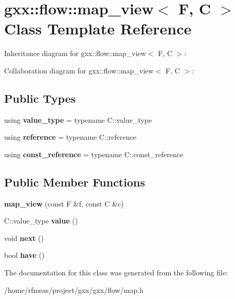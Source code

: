 \hypertarget{classgxx_1_1flow_1_1map__view}{}\section{gxx\+:\+:flow\+:\+:map\+\_\+view$<$ F, C $>$ Class Template Reference}
\label{classgxx_1_1flow_1_1map__view}


Inheritance diagram for gxx\+:\+:flow\+:\+:map\+\_\+view$<$ F, C $>$\+:


Collaboration diagram for gxx\+:\+:flow\+:\+:map\+\_\+view$<$ F, C $>$\+:
\subsection*{Public Types}
\begin{DoxyCompactItemize}
\item 
using {\bfseries value\+\_\+type} = typename C\+::value\+\_\+type\hypertarget{classgxx_1_1flow_1_1map__view_a7eead90d387b96cd8b576ea65512aab6}{}\label{classgxx_1_1flow_1_1map__view_a7eead90d387b96cd8b576ea65512aab6}

\item 
using {\bfseries reference} = typename C\+::reference\hypertarget{classgxx_1_1flow_1_1map__view_a44a6af74c93fb01ddb20a142ad14d72d}{}\label{classgxx_1_1flow_1_1map__view_a44a6af74c93fb01ddb20a142ad14d72d}

\item 
using {\bfseries const\+\_\+reference} = typename C\+::const\+\_\+reference\hypertarget{classgxx_1_1flow_1_1map__view_a8fbc38be10015b63adddd0bdf2beb396}{}\label{classgxx_1_1flow_1_1map__view_a8fbc38be10015b63adddd0bdf2beb396}

\end{DoxyCompactItemize}
\subsection*{Public Member Functions}
\begin{DoxyCompactItemize}
\item 
{\bfseries map\+\_\+view} (const F \&f, const C \&c)\hypertarget{classgxx_1_1flow_1_1map__view_a46c8417113f46ea2e7e4ef9a8f20a938}{}\label{classgxx_1_1flow_1_1map__view_a46c8417113f46ea2e7e4ef9a8f20a938}

\item 
C\+::value\+\_\+type {\bfseries value} ()\hypertarget{classgxx_1_1flow_1_1map__view_a2ed45e05e7c4228c468af488b5c00bb6}{}\label{classgxx_1_1flow_1_1map__view_a2ed45e05e7c4228c468af488b5c00bb6}

\item 
void {\bfseries next} ()\hypertarget{classgxx_1_1flow_1_1map__view_aa63b2e7fc104213feac858c5d8676986}{}\label{classgxx_1_1flow_1_1map__view_aa63b2e7fc104213feac858c5d8676986}

\item 
bool {\bfseries have} ()\hypertarget{classgxx_1_1flow_1_1map__view_a39b976fb2fbc7a16092516a976cb6559}{}\label{classgxx_1_1flow_1_1map__view_a39b976fb2fbc7a16092516a976cb6559}

\end{DoxyCompactItemize}


The documentation for this class was generated from the following file\+:\begin{DoxyCompactItemize}
\item 
/home/rfmeas/project/gxx/gxx/flow/map.\+h\end{DoxyCompactItemize}
